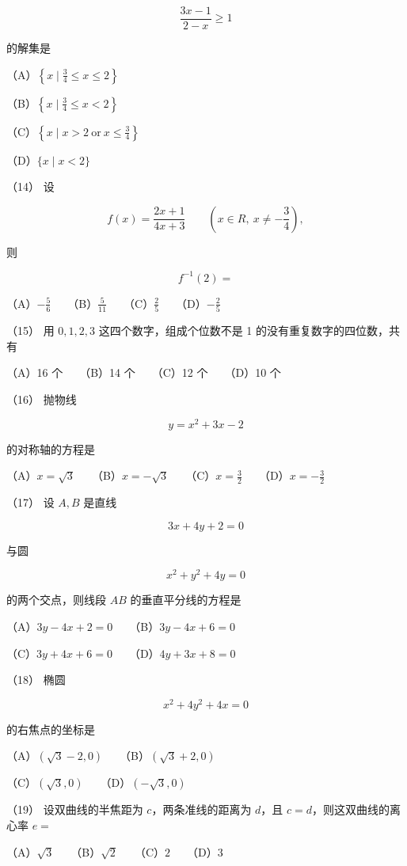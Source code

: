 \begin{answer}
\nopagebreak[4]
\[
\frac{3x-1}{2-x}\geq1
\]

的解集是

（A）$\left\{x\mid\frac34\leq x\leq2\right\}$

（B）$\left\{x\mid\frac34\leq x<2\right\}$

（C）$\left\{x\mid x>2\ \mathrm{or}\ x\leq\frac34\right\}$

（D）$\{x\mid x<2\}$

（14） 设

\nopagebreak[4]
\[
f(x)=\frac{2x+1}{4x+3}\qquad(x\in R,\ x\ne-\frac34),
\]

则

\nopagebreak[4]
\[
f^{-1}(2)=
\]

（A）$-\frac56$　　（B）$\frac5{11}$　　（C）$\frac25$　　（D）$-\frac25$

（15） 用 $0,1,2,3$ 这四个数字，组成个位数不是 1 的没有重复数字的四位数，共有

（A）16 个　　（B）14 个　　（C）12 个　　（D）10 个

（16） 抛物线

\nopagebreak[4]
\[
y=x^2+3x-2
\]

的对称轴的方程是

（A）$x=\sqrt3$　　（B）$x=-\sqrt3$　　（C）$x=\frac32$　　（D）$x=-\frac32$

（17） 设 $A,B$ 是直线

\nopagebreak[4]
\[
3x+4y+2=0
\]

与圆

\nopagebreak[4]
\[
x^2+y^2+4y=0
\]

的两个交点，则线段 $AB$ 的垂直平分线的方程是

（A）$3y-4x+2=0$　　（B）$3y-4x+6=0$

（C）$3y+4x+6=0$　　（D）$4y+3x+8=0$

（18） 椭圆

\nopagebreak[4]
\[
x^2+4y^2+4x=0
\]

的右焦点的坐标是

（A）$(\sqrt3-2,0)$　　（B）$(\sqrt3+2,0)$

（C）$(\sqrt3,0)$　　（D）$(-\sqrt3,0)$

（19） 设双曲线的半焦距为 $c$，两条准线的距离为 $d$，且 $c=d$，则这双曲线的离心率 $e=$

（A）$\sqrt3$　　（B）$\sqrt2$　　（C）$2$　　（D）$3$


\end{answer}
